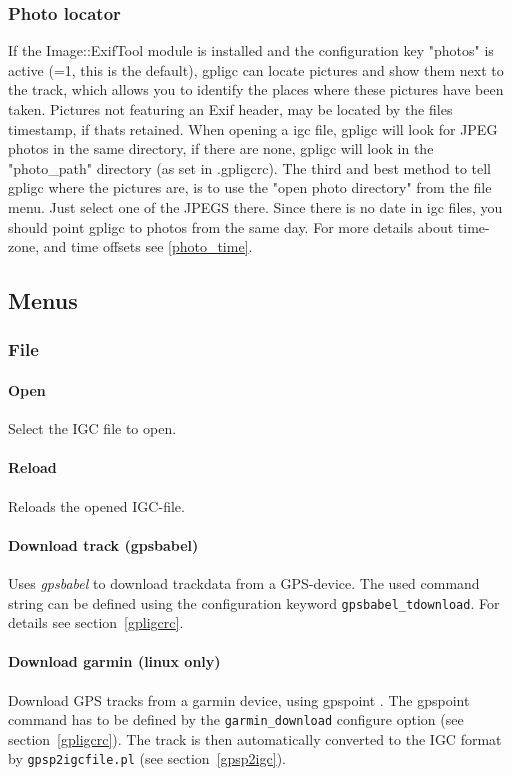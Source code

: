 \subsubsection{Photo locator}
If the Image::ExifTool module is installed and the configuration key "photos" is active (=1, this is the default),
gpligc can locate pictures and show them next to the track, which allows you to identify the places where these pictures have been taken. Pictures not featuring an Exif header, may be located by the files timestamp, if thats retained.
When opening a igc file, gpligc will look for JPEG photos in the same directory, if there are none, gpligc will look in the
"photo\_path" directory (as set in .gpligcrc). The third and best method to tell gpligc where the pictures are, is to use the
"open photo directory" from the file menu. Just select one of the JPEGS there.
Since there is no date in igc files, you should point gpligc to photos from the same day. For more details about time-zone, and time offsets see \ref{photo_time}.


\subsection{Menus}

\subsubsection{File}
\paragraph{Open}
Select the IGC file to open.

\paragraph{Reload}
Reloads the opened IGC-file.

\paragraph{Download track (gpsbabel)}
Uses \emph{gpsbabel} \cite{gpsbabel} to download trackdata from a GPS-device.
The used command string can be defined using the configuration keyword \texttt{gpsbabel\_tdownload}.
For details see section~\ref{gpligcrc}.

\paragraph{Download garmin (linux only)}
Download GPS tracks from a garmin device, using gpspoint \cite{gpspoint}.
The gpspoint command has to be defined by the \texttt{garmin\_download} configure option (see section~\ref{gpligcrc}).
The track is then automatically converted to the IGC format by \texttt{gpsp2igcfile.pl} (see section~\ref{gpsp2igc}).

